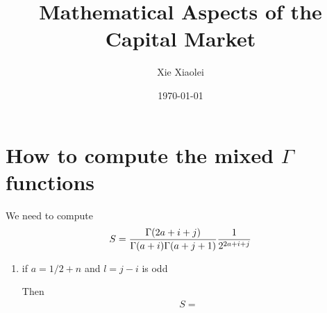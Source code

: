 \documentclass{article}
\title{Mathematical Aspects of the Capital Market}
\author{Xie Xiaolei}
\date{\today}
\begin{document}
\section{How to compute the mixed $\Gamma$ functions}
We need to compute
\begin{equation*}
S = {\Gamma(2a + i + j)
    \over
    \Gamma(a+i) \Gamma(a+j+1)
  } {
    1 \over 2^{2a+i+j}
  }
\end{equation*}
\begin{enumerate}
\item if $a = 1/2 + n$ and $l=j-i$ is odd

Then
\begin{eqnarray*}
  S = 
\end{eqnarray*}
\end{enumerate}
\maketitle
\end{document}
